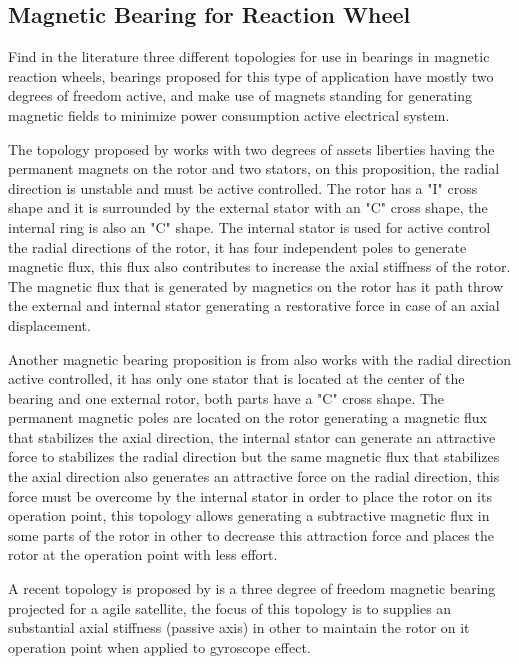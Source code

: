 \documentclass[10pt,fleqn,a4paper,twoside]{article}
\begin{document}
\subsection{Magnetic Bearing for Reaction Wheel}

Find in the literature three different topologies for use in bearings in magnetic reaction wheels, bearings proposed for this type of application have mostly two degrees of freedom active, and make use of magnets standing for generating magnetic fields to minimize power consumption active electrical system. 

The topology proposed by \cite{Bernus1998} works with two degrees of assets liberties having the permanent magnets on the rotor and two stators, on this proposition, the radial direction is unstable and must be active controlled. The rotor has a "I" cross shape and it is surrounded by the external stator with an "C" cross shape, the internal ring is also an "C" shape. The internal stator is used for active control the radial directions of the rotor, it has four independent poles to generate magnetic flux, this flux also contributes to increase the axial stiffness of the rotor. The magnetic flux that is generated by magnetics on the rotor has it path throw the external and internal stator generating a restorative force in case of an axial displacement. 

Another magnetic bearing proposition is from \cite{Scharfe2001} also works with the radial direction active controlled, it has only one stator that is located at the center of the bearing and one external rotor, both parts have a "C" cross shape. The permanent magnetic poles are located on the rotor generating a magnetic flux that stabilizes the axial direction, the internal stator can generate an attractive force to stabilizes the radial direction but the same magnetic flux that stabilizes the axial direction also generates an attractive force on the radial direction, this force must be overcome by the internal stator in order to place the rotor on its operation point, this topology allows generating a subtractive magnetic flux in some parts of the rotor in other to decrease this attraction force and places the rotor at the operation point with less effort. 

A recent topology is proposed by \cite{Bangcheng2012} is a three degree of freedom magnetic bearing projected for a agile satellite, the focus of this topology is to supplies an substantial axial stiffness (passive axis) in other to maintain the rotor on it operation point when applied to  gyroscope effect.
\end{document}
